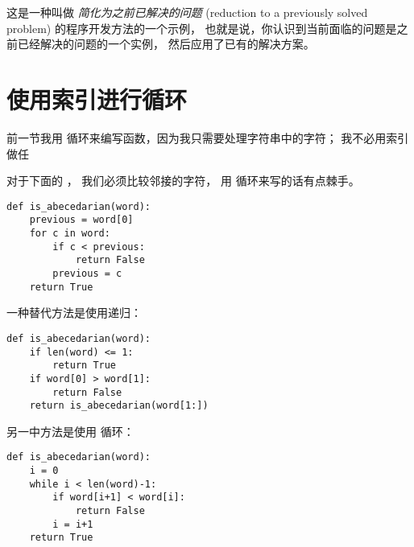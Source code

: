 这是一种叫做 {\em 简化为之前已解决的问题} (reduction to a
previously solved problem) 的程序开发方法的一个示例，
也就是说，你认识到当前面临的问题是之前已经解决的问题的一个实例，
然后应用了已有的解决方案。


\section{使用索引进行循环}
  


前一节我用  循环来编写函数，因为我只需要处理字符串中的字符；
我不必用索引做任


对于下面的  ， 我们必须比较邻接的字符， 用  循环来写的话有点棘手。

\begin{lstlisting}
def is_abecedarian(word):
    previous = word[0]
    for c in word:
        if c < previous:
            return False
        previous = c
    return True
\end{lstlisting}


一种替代方法是使用递归：

\begin{lstlisting}
def is_abecedarian(word):
    if len(word) <= 1:
        return True
    if word[0] > word[1]:
        return False
    return is_abecedarian(word[1:])
\end{lstlisting}


另一中方法是使用  循环：

\begin{lstlisting}
def is_abecedarian(word):
    i = 0
    while i < len(word)-1:
        if word[i+1] < word[i]:
            return False
        i = i+1
    return True
\end{lstlisting}

